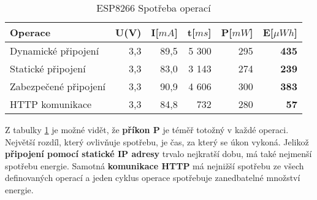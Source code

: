 \documentclass[a4paper, 12pt]{report}
\begin{document}

				\begin{table}[h]
					\centering
					\caption{ESP8266 Spotřeba operací}
					\begin{tabular}{||l| r r r r |r||}
						\hline
						Operace & U(V) & I[$mA$] & t[$ms$] & P[$mW$] & \textbf{E}[$\mu Wh$]\\
						\hline
						\hline
					Dynamické připojení & 3,3 & 89,5 & 5 300 & 295 & \textbf{435}\\
					Statické připojení & 3,3 & 83,0 & 3 143 & 274 & \textbf{239}\\
					Zabezpečené připojení & 3,3 & 90,9 & 4 606 & 300 & \textbf{383}\\
					HTTP komunikace & 3,3 & 84,8 & 732 & 280 & \textbf{57}\\
					\hline
					\end{tabular}
					\label{Spotreba_operaci}
				\end{table}
					Z tabulky \ref{Spotreba_operaci} je možné vidět, že {\bf příkon P} je téměř totožný v každé operaci. Největší rozdíl, který ovlivňuje spotřebu, je čas, za který se úkon vykoná. Jelikož {\bf připojení pomocí statické IP adresy} trvalo nejkratší dobu, má také nejmenší spotřebu energie.
					Samotná {\bf komunikace HTTP} má nejnižší spotřebu ze všech definovaných operací a jeden cyklus operace spotřebuje zanedbatelné množství energie.
\end{document}
